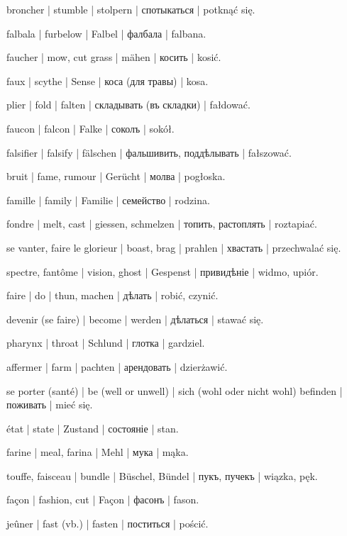 \begin{outdent}{1em}
\uvsubentry{}
broncher | stumble | stolpern | спотыкаться | potknąć się.

falbala | furbelow | Falbel | фалбала | falbana.

faucher | mow, cut grass | mähen | косить | kosić.

\uvsubentry{}
faux | scythe | Sense | коса (для травы) | kosa.

plier | fold | falten | складывать (въ складки) | fałdować.

faucon | falcon | Falke | соколъ | sokół.

falsifier | falsify | fälschen | фальшивить, поддѣлывать | fałszować.

bruit | fame, rumour | Gerücht | молва | pogłoska.

famille | family | Familie | семейство | rodzina.

fondre | melt, cast | giessen, schmelzen | топить, растоплять | roztapiać.

se vanter, faire le glorieur | boast, brag | prahlen | хвастать | przechwalać się.

spectre, fantôme | vision, ghost | Gespenst | привидѣніе | widmo, upiór.

faire | do | thun, machen | дѣлать | robić, czynić.

\uvsubentry{}
devenir (se faire) | become | werden | дѣлаться | stawać się.

pharynx | throat | Schlund | глотка | gardziel.

affermer | farm | pachten | арендовать | dzierżawić.

se porter (santé) | be (well or unwell) | sich (wohl oder
nicht wohl) befinden | поживать | mieć się.

\uvsubentry{}
état | state | Zustand | состояніе | stan.

farine | meal, farina | Mehl | мука | mąka.

touffe, faisceau | bundle | Büschel, Bündel | пукъ, пучекъ | wiązka, pęk.

façon | fashion, cut | Façon | фасонъ | fason.

jeûner | fast (vb.) | fasten | поститься | pościć.


\end{outdent}
